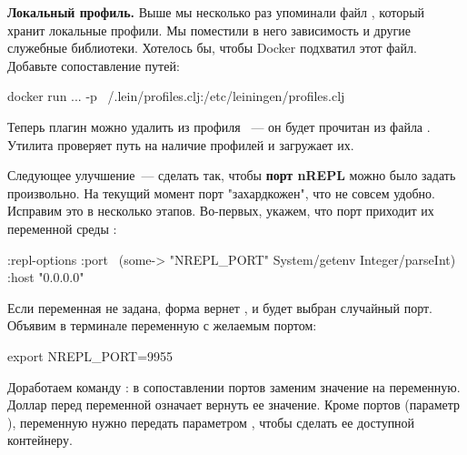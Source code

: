 \textbf{Локальный профиль.} Выше мы несколько раз упоминали файл , который хранит локальные профили. Мы поместили в него зависимость  и другие служебные библиотеки. Хотелось бы, чтобы Docker подхватил этот файл. Добавьте сопоставление путей:

\begin{english}
  \begin{clojure}
docker run ... -p ~/.lein/profiles.clj:/etc/leiningen/profiles.clj
  \end{clojure}
\end{english}

Теперь плагин  можно удалить из профиля ~--- он будет прочитан из файла . Утилита  проверяет путь  на наличие профилей и загружает их.

Следующее улучшение~--- сделать так, чтобы \textbf{порт nREPL} можно было задать произвольно. На текущий момент порт "захардкожен", что не совсем удобно. Исправим это в несколько этапов. Во-первых, укажем, что порт приходит их переменной среды :

\begin{english}
  \begin{clojure}
:repl-options
{:port ~(some-> "NREPL_PORT" System/getenv Integer/parseInt)
 :host "0.0.0.0"}
  \end{clojure}
\end{english}

Если переменная не задана, форма  вернет , и будет выбран случайный порт. Объявим в терминале переменную с желаемым портом:

\begin{english}
  \begin{bash}
export NREPL_PORT=9955
  \end{bash}
\end{english}

Доработаем команду : в сопоставлении портов заменим значение на переменную. Доллар перед переменной означает вернуть ее значение. Кроме портов (параметр ), переменную нужно передать параметром , чтобы сделать ее доступной контейнеру.

\begin{english}
\end{english}

